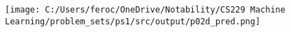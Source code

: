 \begin{answer}
\newline
  \texttt{[image: C:/Users/feroc/OneDrive/Notability/CS229 Machine Learning/problem\_sets/ps1/src/output/p02d\_pred.png]}
\end{answer}
